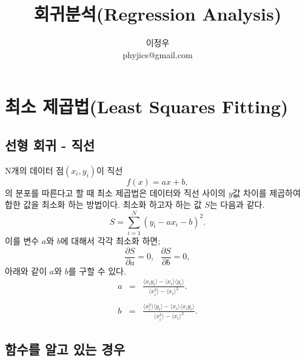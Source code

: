 \documentclass[chapter,a4paper,10pt]{oblivoir}
\begin{document}
\title{회귀분석(Regression Analysis)}
\author{이정우\\phyjics@gmail.com}
\maketitle
\tableofcontents

\chapter{최소 제곱법(Least Squares Fitting)}

\section{선형 회귀 - 직선}

N개의 데이터 점$(x_i, y_i)$이 직선
\begin{equation}
f(x) = ax + b,
\end{equation}
의 분포를 따른다고 할 때 최소 제곱법은 데이터와 직선 사이의 $y$값 차이를 제곱하여 합한 값을 최소화 하는 방법이다.
최소화 하고자 하는 값 $S$는 다음과 같다.
\begin{equation}
S = \sum_{i=1}^N (y_i - ax_i - b)^2.
\end{equation}
이를 변수 $a$와 $b$에 대해서 각각 최소화 하면;
\begin{equation}
\frac{\partial S}{\partial a} = 0,\,\,\,\, \frac{\partial S}{\partial b} = 0,
\end{equation}
아래와 같이 $a$와 $b$를 구할 수 있다.
\begin{eqnarray}
a
&=& \frac{\langle x_i y_i \rangle - \langle x_i \rangle \langle y_i\rangle}{\langle x_i^2 \rangle - \langle x_i \rangle^2}.
\\\nonumber\\
b
&=& \frac{\langle x_i^2 \rangle \langle y_i \rangle - \langle x_i \rangle \langle x_i y_i\rangle}{\langle x_i^2 \rangle- \langle x_i\rangle^2}.
\end{eqnarray}


\section{함수를 알고 있는 경우}
\end{document}
